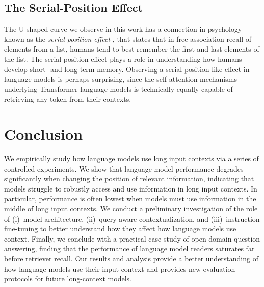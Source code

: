 \subsection{The Serial-Position Effect} The U-shaped curve we observe in this work has a connection in psychology known as the \textit{serial-position effect} \cite{ebbinghaus1913memory,murdock1962serial}, that states that in free-association recall of elements from a list, humans tend to best remember the first and last elements of the list. The serial-position effect plays a role in understanding how humans develop short- and long-term memory. Observing a serial-position-like effect in language models is perhaps surprising, since the self-attention mechanisms underlying Transformer language models is technically equally capable of retrieving any token from their contexts.

\section{Conclusion}

We empirically study how language models use long input contexts via a series of controlled experiments. We show that language model performance degrades significantly when changing the position of relevant information, indicating that models struggle to robustly access and use information in long input contexts. In particular, performance is often lowest when models must use information in the middle of long input contexts. We conduct a preliminary investigation of the role of (i)~model architecture, (ii)~query-aware contextualization, and (iii)~instruction fine-tuning to better understand how they affect how language models use context. Finally, we conclude with a practical case study of open-domain question answering, finding that the performance of language model readers saturates far before retriever recall. Our results and analysis provide a better understanding of how language models use their input context and provides new evaluation protocols for future long-context models.


